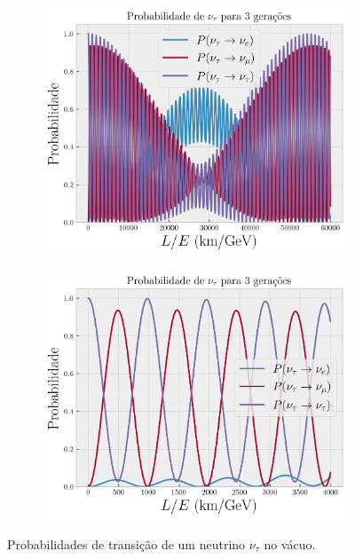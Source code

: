 \documentclass[12pt]{report}
\begin{document}
\begin{figure}[H]
\centering
\begin{subfigure}{.5\textwidth}
  \centering
  \includegraphics[width=.75\linewidth]{fig/3nu-vacuo-tau.png}
  \caption{}
  \label{fig:vacuo-tau}
\end{subfigure}%
\begin{subfigure}{.5\textwidth}
  \centering
  \includegraphics[width=.75\linewidth]{fig/3nu-vacuo-tau_short.png}
  \caption{}
  \label{fig:vacuo-tau_short}
\end{subfigure}
\caption{Probabilidades de transição de um neutrino $\nu_\tau$ no vácuo.}
\label{fig:vacuo_tau}
\end{figure}
\end{document}
